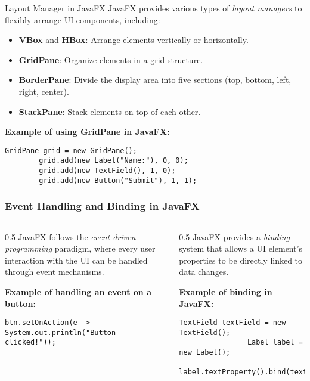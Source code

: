 \documentclass[aspectratio=169, table]{beamer}
\begin{document}
\begin{frame}[fragile]{Layout Manager in JavaFX}
	\vspace{20pt}
	JavaFX provides various types of \textit{layout managers} to flexibly arrange UI components, including:
	\begin{itemize}
		\item \textbf{VBox} and \textbf{HBox}: Arrange elements vertically or horizontally.
		\item \textbf{GridPane}: Organize elements in a grid structure.
		\item \textbf{BorderPane}: Divide the display area into five sections (top, bottom, left, right, center).
		\item \textbf{StackPane}: Stack elements on top of each other.
	\end{itemize}
	
	\bigskip
	\textbf{Example of using GridPane in JavaFX:}
	
	\begin{lstlisting}[style=JavaStyle]
		GridPane grid = new GridPane();
		grid.add(new Label("Name:"), 0, 0);
		grid.add(new TextField(), 1, 0);
		grid.add(new Button("Submit"), 1, 1);
	\end{lstlisting}
\end{frame}


\begin{frame}[fragile]
	\frametitle{Event Handling and Binding in JavaFX}
	\begin{columns}
		\begin{column}{0.5\textwidth}
			JavaFX follows the \textit{event-driven programming} paradigm,  
			where every user interaction with the UI can be handled through event mechanisms.
			
			\bigskip
			\textbf{Example of handling an event on a button:}
			
			\begin{lstlisting}[style=JavaStyle]
				btn.setOnAction(e -> System.out.println("Button clicked!"));
			\end{lstlisting}
		\end{column}
		\begin{column}{0.5\textwidth}
			JavaFX provides a \textit{binding} system that allows a UI element's properties  
			to be directly linked to data changes.
			
			\bigskip
			\textbf{Example of binding in JavaFX:}
			
			\begin{lstlisting}[style=JavaStyle]
				TextField textField = new TextField();
				Label label = new Label();
				label.textProperty().bind(textField.textProperty());
			\end{lstlisting}
		\end{column}
	\end{columns}
\end{frame}
\end{document}
